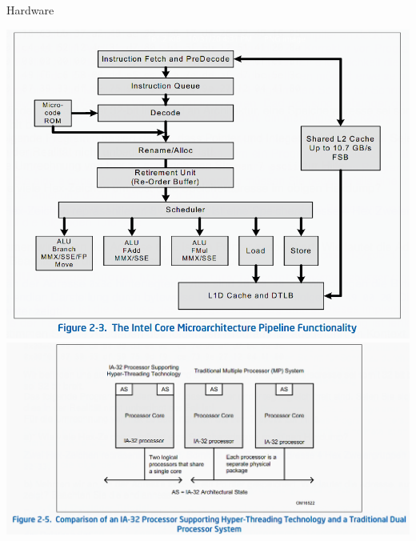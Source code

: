 \documentclass[10pt]{beamer}
\begin{document}
\begin{frame}[allowframebreaks]{Hardware}
\begin{center}
    \includegraphics[keepaspectratio, width=\textwidth, height=\textheight-2\baselineskip-2\baselineskip]{img/001_execution_engine_i7.png} \\ \framebreak
    \includegraphics[keepaspectratio, width=\textwidth, height=\textheight-2\baselineskip-2\baselineskip]{img/001_hyperthreadding.png} \\ \framebreak

\end{center}
\end{frame}
\end{document}
